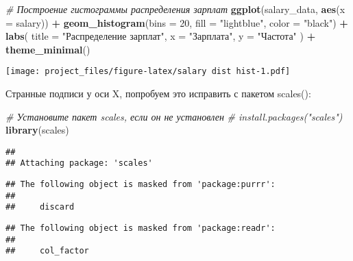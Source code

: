 \documentclass[
]{article}
\newenvironment{Shaded}{\begin{snugshade}}{\end{snugshade}}
\newcommand{\AttributeTok}[1]{\textcolor[rgb]{0.13,0.29,0.53}{#1}}
\newcommand{\CommentTok}[1]{\textcolor[rgb]{0.56,0.35,0.01}{\textit{#1}}}
\newcommand{\DecValTok}[1]{\textcolor[rgb]{0.00,0.00,0.81}{#1}}
\newcommand{\FunctionTok}[1]{\textcolor[rgb]{0.13,0.29,0.53}{\textbf{#1}}}
\newcommand{\NormalTok}[1]{#1}
\newcommand{\SpecialCharTok}[1]{\textcolor[rgb]{0.81,0.36,0.00}{\textbf{#1}}}
\newcommand{\StringTok}[1]{\textcolor[rgb]{0.31,0.60,0.02}{#1}}
\begin{document}
\begin{Shaded}
\begin{Highlighting}[]
\CommentTok{\# Построение гистограммы распределения зарплат}
\FunctionTok{ggplot}\NormalTok{(salary\_data, }\FunctionTok{aes}\NormalTok{(}\AttributeTok{x =}\NormalTok{ salary)) }\SpecialCharTok{+}
  \FunctionTok{geom\_histogram}\NormalTok{(}\AttributeTok{bins =} \DecValTok{20}\NormalTok{, }\AttributeTok{fill =} \StringTok{"lightblue"}\NormalTok{, }\AttributeTok{color =} \StringTok{"black"}\NormalTok{) }\SpecialCharTok{+}
  \FunctionTok{labs}\NormalTok{(}
    \AttributeTok{title =} \StringTok{"Распределение зарплат"}\NormalTok{,}
    \AttributeTok{x =} \StringTok{"Зарплата"}\NormalTok{,}
    \AttributeTok{y =} \StringTok{"Частота"}
\NormalTok{  ) }\SpecialCharTok{+}
  \FunctionTok{theme\_minimal}\NormalTok{()}
\end{Highlighting}
\end{Shaded}

\texttt{[image: project\_files/figure-latex/salary dist hist-1.pdf]}

Странные подписи у оси X, попробуем это исправить с пакетом scales():

\begin{Shaded}
\begin{Highlighting}[]
\CommentTok{\# Установите пакет scales, если он не установлен}
\CommentTok{\# install.packages("scales")}
\FunctionTok{library}\NormalTok{(scales)}
\end{Highlighting}
\end{Shaded}

\begin{verbatim}
## 
## Attaching package: 'scales'
\end{verbatim}

\begin{verbatim}
## The following object is masked from 'package:purrr':
## 
##     discard
\end{verbatim}

\begin{verbatim}
## The following object is masked from 'package:readr':
## 
##     col_factor
\end{verbatim}
\end{document}
